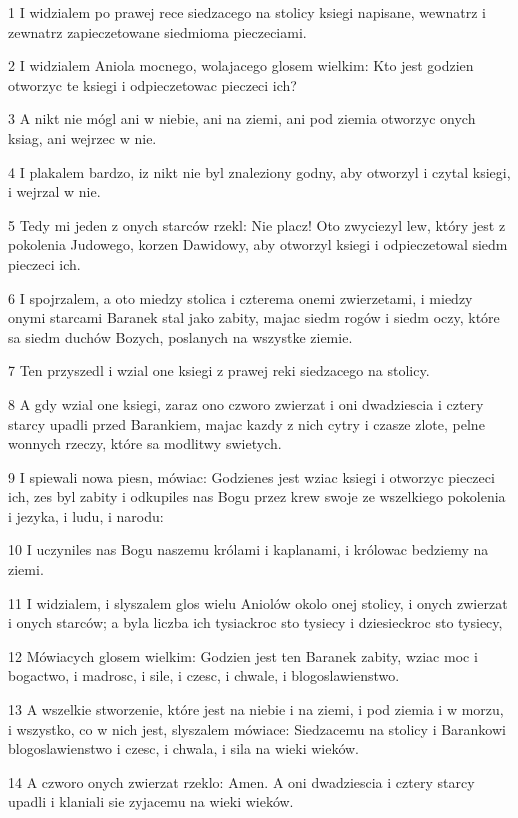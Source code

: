 \par 1 I widzialem po prawej rece siedzacego na stolicy ksiegi napisane, wewnatrz i zewnatrz zapieczetowane siedmioma pieczeciami.
\par 2 I widzialem Aniola mocnego, wolajacego glosem wielkim: Kto jest godzien otworzyc te ksiegi i odpieczetowac pieczeci ich?
\par 3 A nikt nie mógl ani w niebie, ani na ziemi, ani pod ziemia otworzyc onych ksiag, ani wejrzec w nie.
\par 4 I plakalem bardzo, iz nikt nie byl znaleziony godny, aby otworzyl i czytal ksiegi, i wejrzal w nie.
\par 5 Tedy mi jeden z onych starców rzekl: Nie placz! Oto zwyciezyl lew, który jest z pokolenia Judowego, korzen Dawidowy, aby otworzyl ksiegi i odpieczetowal siedm pieczeci ich.
\par 6 I spojrzalem, a oto miedzy stolica i czterema onemi zwierzetami, i miedzy onymi starcami Baranek stal jako zabity, majac siedm rogów i siedm oczy, które sa siedm duchów Bozych, poslanych na wszystke ziemie.
\par 7 Ten przyszedl i wzial one ksiegi z prawej reki siedzacego na stolicy.
\par 8 A gdy wzial one ksiegi, zaraz ono czworo zwierzat i oni dwadziescia i cztery starcy upadli przed Barankiem, majac kazdy z nich cytry i czasze zlote, pelne wonnych rzeczy, które sa modlitwy swietych.
\par 9 I spiewali nowa piesn, mówiac: Godzienes jest wziac ksiegi i otworzyc pieczeci ich, zes byl zabity i odkupiles nas Bogu przez krew swoje ze wszelkiego pokolenia i jezyka, i ludu, i narodu:
\par 10 I uczyniles nas Bogu naszemu królami i kaplanami, i królowac bedziemy na ziemi.
\par 11 I widzialem, i slyszalem glos wielu Aniolów okolo onej stolicy, i onych zwierzat i onych starców; a byla liczba ich tysiackroc sto tysiecy i dziesieckroc sto tysiecy,
\par 12 Mówiacych glosem wielkim: Godzien jest ten Baranek zabity, wziac moc i bogactwo, i madrosc, i sile, i czesc, i chwale, i blogoslawienstwo.
\par 13 A wszelkie stworzenie, które jest na niebie i na ziemi, i pod ziemia i w morzu, i wszystko, co w nich jest, slyszalem mówiace: Siedzacemu na stolicy i Barankowi blogoslawienstwo i czesc, i chwala, i sila na wieki wieków.
\par 14 A czworo onych zwierzat rzeklo: Amen. A oni dwadziescia i cztery starcy upadli i klaniali sie zyjacemu na wieki wieków.

